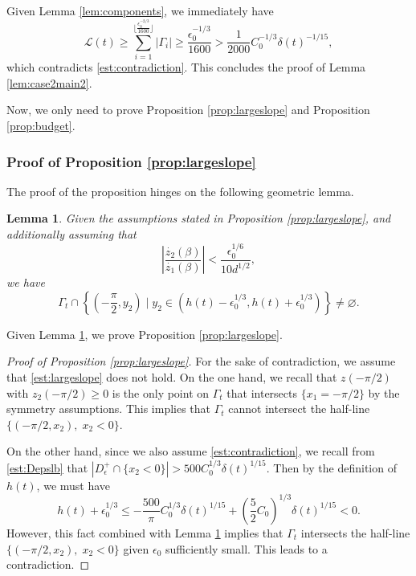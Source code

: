 \documentclass[11pt]{article}
\numberwithin{equation}{section}
\newtheorem{lem}[thm]{Lemma}
\newcommand{\eps}{\epsilon}
\newcommand{\calL}{\mathcal{L}}
\begin{document}
Given Lemma \ref{lem:components}, we immediately have
$$
\calL(t) \ge \sum_{i = 1}^{\lfloor\frac{\eps_0^{-2/3}}{1600} \rfloor}|\Gamma_i| \ge \frac{\eps_0^{-1/3}}{1600} > \frac{1}{2000}C_0^{-1/3}\delta(t)^{-1/15},
$$
which contradicts \eqref{est:contradiction}. This concludes the proof of Lemma \ref{lem:case2main2}.

Now, we only need to prove Proposition \ref{prop:largeslope} and Proposition \ref{prop:budget}.

\subsubsection{Proof of Proposition \ref{prop:largeslope}}
The proof of the proposition hinges on the following geometric lemma.
\begin{lem}\label{lem:largeslopeaux1}
    Given the assumptions stated in Proposition \ref{prop:largeslope}, and additionally assuming that 
    \begin{equation}\label{est:lemlargeslopeaux1}
    \left|\frac{\dot{z_2}(\beta)}{\dot{z_1}(\beta)}\right| < \frac{\eps_0^{1/6}}{10d^{1/2}},
    \end{equation}
    we have
    $$
    \Gamma_t \cap \left\{\left(-\frac{\pi}{2}, y_2\right)\;|\; y_2 \in (h(t) - \eps_0^{1/3}, h(t) +\eps_0^{1/3})\right\} \neq \varnothing.
    $$
\end{lem}
Given Lemma \ref{lem:largeslopeaux1}, we prove Proposition \ref{prop:largeslope}. 

\begin{proof}[Proof of Proposition \ref{prop:largeslope}]
For the sake of contradiction, we assume that \eqref{est:largeslope} does not hold. On the one hand, we recall that $z(-\pi/2)$ with $z_2(-\pi/2) \ge 0$ is the only point on $\Gamma_t$ that intersects $\{x_1 = -\pi/2\}$ by the symmetry assumptions. This implies that $\Gamma_t$ cannot intersect the half-line $\{(-\pi/2, x_2),\; x_2 < 0\}$. 

On the other hand, since we also assume \eqref{est:contradiction}, we recall from \eqref{est:Depslb} that $|D_\eps^+ \cap \{x_2 < 0\}| > 500C_0^{1/3}\delta(t)^{{1/15}}$. Then by the definition of $h(t)$, we must have 
$$
h(t) + \eps_0^{1/3} \le -\frac{500}{\pi}C_0^{1/3}\delta(t)^{{1/15}} + \left({\frac52}C_0\right)^{1/3}\delta(t)^{{1/15}} < 0.
$$
However, this fact combined with Lemma \ref{lem:largeslopeaux1} implies that $\Gamma_t$ intersects the half-line $\{(-\pi/2, x_2),\; x_2 < 0\}$ given $\eps_0$ sufficiently small. This leads to a contradiction.
\end{proof}
\end{document}
